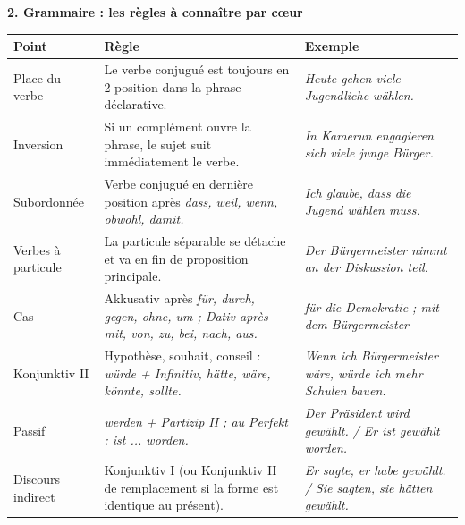 \documentclass[11pt]{article}
\newcommand{\all}[1]{\ifmmode\text{\textit{#1}}\else\begingroup\selectlanguage{ngerman}\itshape #1\endgroup\fi}
\begin{document}
\begin{bilan}
\textbf{2. Grammaire : les règles à connaître par cœur}
\begin{center}
\begin{tabularx}{\linewidth}{|l|X|X|}
\hline
\rowcolor{popblueL} \textbf{Point} & \textbf{Règle} & \textbf{Exemple} \\
\hline
Place du verbe & Le verbe conjugué est toujours en 2\up{e} position dans la phrase déclarative. & \all{Heute gehen viele Jugendliche wählen.} \\
\hline
Inversion & Si un complément ouvre la phrase, le sujet suit immédiatement le verbe. & \all{In Kamerun engagieren sich viele junge Bürger.} \\
\hline
Subordonnée & Verbe conjugué en dernière position après \all{dass, weil, wenn, obwohl, damit}. & \all{Ich glaube, dass die Jugend wählen muss.} \\
\hline
Verbes à particule & La particule séparable se détache et va en fin de proposition principale. & \all{Der Bürgermeister nimmt an der Diskussion teil.} \\
\hline
Cas & Akkusativ après \all{für, durch, gegen, ohne, um} ; Dativ après \all{mit, von, zu, bei, nach, aus}. & \all{für die Demokratie ; mit dem Bürgermeister} \\
\hline
Konjunktiv II & Hypothèse, souhait, conseil : \all{würde + Infinitiv}, \all{hätte, wäre, könnte, sollte}. & \all{Wenn ich Bürgermeister wäre, würde ich mehr Schulen bauen.} \\
\hline
Passif & \all{werden + Partizip II} ; au Perfekt : \all{ist ... worden}. & \all{Der Präsident wird gewählt. / Er ist gewählt worden.} \\
\hline
Discours indirect & Konjunktiv I (ou Konjunktiv II de remplacement si la forme est identique au présent). & \all{Er sagte, er habe gewählt. / Sie sagten, sie hätten gewählt.} \\
\hline
\end{tabularx}
\end{center}


\end{bilan}
\end{document}

